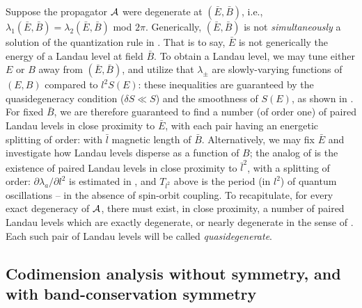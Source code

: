 \documentclass[aps, prb, showpacs, twocolumn, notitlepage, superscriptaddress]{revtex4-1}
\begin{document}
Suppose the propagator ${\cal A}$ were degenerate at $(\bar{E},\bar{B})$, i.e., $\lambda_1(\bar{E},\bar{B})=\lambda_2(\bar{E},\bar{B})$ mod $2\pi$. Generically, $(\bar{E},\bar{B})$ is not \emph{simultaneously} a solution of the quantization rule in . That is to say, $\bar{E}$ is not generically the energy of a Landau level at field $\bar{B}$. To obtain a Landau level, we may tune either $E$ or $B$   away from $(\bar{E},\bar{B})$, and  utilize that  $\lambda_{\pm}$ are slowly-varying functions of $(E,B)$ compared to $l^2S(E)$:
these inequalities are guaranteed by the quasidegeneracy condition ($\delta S{\ll}S$) and the smoothness of $S(E)$, as shown in .  For fixed $\bar{B}$, we are therefore guaranteed to find a number (of order one) of paired Landau levels  in close proximity to $\bar{E}$, with each pair having an energetic splitting of order:
with $\bar{l}$ magnetic length of $\bar{B}$. Alternatively, we may fix $\bar{E}$ and investigate how Landau levels disperse as a function of $B$; the analog of   is the existence of paired Landau levels in close proximity to $\bar{l}^2$, with a splitting of order:
$\partial \lambda_a/\partial l^2$ is estimated in , and
$T_{l^2}$ above is the period (in $l^2$) of quantum oscillations -- in the absence of spin-orbit coupling. To recapitulate, for every exact degeneracy of ${\cal A}$, there must exist, in close proximity, a number of paired Landau levels which are exactly degenerate, or nearly degenerate in the sense of . Each such pair of Landau levels will be called \textit{quasidegenerate}.

\subsection{Codimension analysis without symmetry, and with band-conservation symmetry}\label{sec:introducecodimension}
\end{document}
